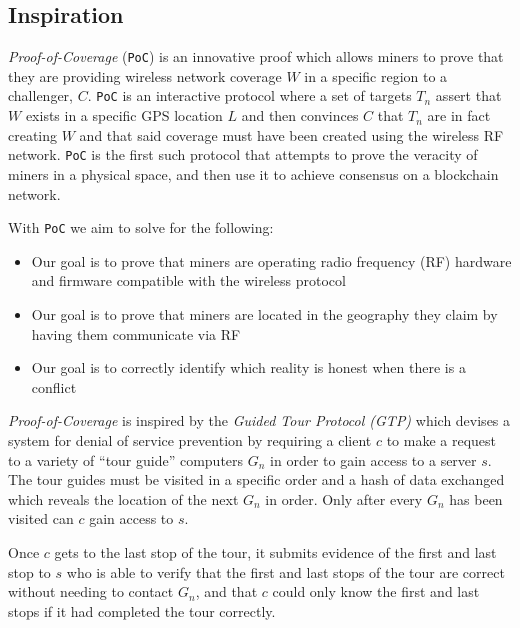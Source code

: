 \documentclass[letterpaper,11pt]{article}
\def\coverage/{$\mathit{W}$}
\def\location/{$\mathit{L}$}
\def\proofofcoverage/{\emph{Proof-of-Coverage}}
\begin{document}
\subsection{Inspiration}

\proofofcoverage/ (\verb|PoC|) is an innovative proof which allows miners to prove that they are providing wireless network coverage \coverage/ in a specific region to a challenger, $\mathit{C}$. \verb|PoC| is an interactive protocol where a set of targets $\mathit{T_n}$ assert that \coverage/ exists in a specific GPS location \location/ and then convinces $\mathit{C}$ that $\mathit{T_n}$ are in fact creating \coverage/ and that said coverage must have been created using the wireless RF network. \verb|PoC| is the first such protocol that attempts to prove the veracity of miners in a physical space, and then use it to achieve consensus on a blockchain network.\newline

With \verb|PoC| we aim to solve for the following:

\begin{itemize}
	\item Our goal is to prove that miners are operating radio frequency (RF) hardware and firmware compatible with the wireless protocol
	\item Our goal is to prove that miners are located in the geography they claim by having them communicate via RF
	\item Our goal is to correctly identify which reality is honest when there is a conflict
\end{itemize}

\proofofcoverage/ is inspired by the \emph{Guided Tour Protocol (GTP)} which devises a system for denial of service prevention by requiring a client $\mathit{c}$ to make a request to a variety of ``tour guide'' computers $\mathit{G_n}$ in order to gain access to a server $\mathit{s}$. The tour guides must be visited in a specific order and a hash of data exchanged which reveals the location of the next $\mathit{G_n}$ in order. Only after every $\mathit{G_n}$ has been visited can $\mathit{c}$ gain access to $\mathit{s}$.\newline

Once $\mathit{c}$ gets to the last stop of the tour, it submits evidence of the first and last stop to $\mathit{s}$ who is able to verify that the first and last stops of the tour are correct without needing to contact $\mathit{G_n}$, and that $\mathit{c}$ could only know the first and last stops if it had completed the tour correctly.\newline
\end{document}
